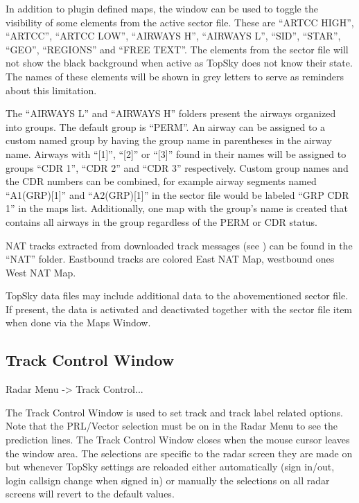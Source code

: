 \documentclass[11pt,a4paper]{memoir}
\begin{document}
In addition to plugin defined maps, the window can be used to toggle the visibility of some elements from the active sector file. These are “ARTCC HIGH”, “ARTCC”, “ARTCC LOW”, “AIRWAYS H”, “AIRWAYS L”, “SID”, “STAR”, “GEO”, “REGIONS” and “FREE TEXT”. The elements from the sector file will not show the black background when active as TopSky does not know their state. The names of these elements will be shown in grey letters to serve as reminders about this limitation.

The “AIRWAYS L” and “AIRWAYS H” folders present the airways organized into groups. The default group is “PERM”. An airway can be assigned to a custom named group by having the group name in parentheses in the airway name. Airways with “[1]”, “[2]” or “[3]” found in their names will be assigned to groups “CDR 1”, “CDR 2” and “CDR 3” respectively. Custom group names and the CDR numbers can be combined, for example airway segments named “A1(GRP)[1]” and “A2(GRP)[1]” in the sector file would be labeled “GRP CDR 1” in the maps list. Additionally, one map with the group’s name is created that contains all airways in the group regardless of the PERM or CDR status.

NAT tracks extracted from downloaded track messages (see \textit{}) can be found in the “NAT” folder. Eastbound tracks are colored East NAT Map, westbound ones West NAT Map.

TopSky data files may include additional data to the abovementioned sector file. If present, the data is activated and deactivated together with the sector file item when done via the Maps Window.

\subsection{Track Control Window}
\label{win:tcw}

Radar Menu -> Track Control...

The Track Control Window is used to set track and track label related options. Note that the PRL/Vector selection must be on in the Radar Menu to see the prediction lines. The Track Control Window closes when the mouse cursor leaves the window area. The selections are specific to the radar screen they are made on but whenever TopSky settings are reloaded either automatically (sign in/out, login callsign change when signed in) or manually the selections on all radar screens will revert to the default values.
\end{document}
